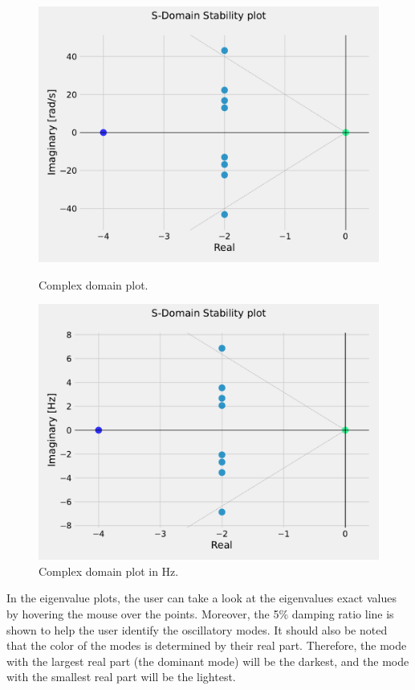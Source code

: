 \begin{figure}[H]
  \centering
  \begin{minipage}{0.49\textwidth}
    \centering
    \includegraphics[width=\linewidth]{figures/smallsignal_plot_GUI.pdf}
    \caption{Complex domain plot.}
    \label{fig:plot_ss_GUI}
  \end{minipage}
  \hfill
  \begin{minipage}{0.49\textwidth}
    \centering
    \includegraphics[width=\linewidth]{figures/smallsignal_plot_Hz_GUI.pdf}
    \caption{Complex domain plot in Hz.}
    \label{fig:plot_ss_Hz_GUI}
  \end{minipage}
\end{figure}

In the eigenvalue plots, the user can take a look at the eigenvalues exact values
by hovering the mouse over the points. Moreover, the 5\% damping ratio line is shown to help the user identify
the oscillatory modes. It should also be noted that the color of the modes is determined by their real part.
 Therefore, the mode with the largest real part (the dominant mode) will be the darkest, 
 and the mode with the smallest real part will be the lightest.








